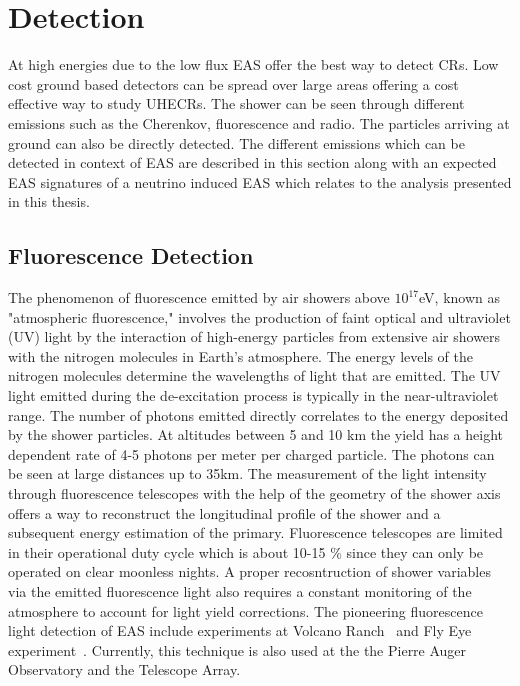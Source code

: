 \section{Detection}
\label{sec:EAS_det}
At high energies due to the low flux EAS offer the best way to detect CRs. Low cost ground based detectors can be spread over large areas offering a cost effective way to study UHECRs. The shower can be seen through different emissions such as the Cherenkov, fluorescence and radio. The particles arriving at ground can also be directly detected. The different emissions which can be detected in context of EAS are described in this section along with an expected EAS signatures of a neutrino induced EAS which relates to the analysis presented in this thesis.

\subsection*{Fluorescence Detection}
\label{sec:EAS_flu}
The phenomenon of fluorescence emitted by air showers above $10^{17}$eV, known as "atmospheric fluorescence," involves the production of faint optical and ultraviolet (UV) light by the interaction of high-energy particles from extensive air showers with the nitrogen molecules in Earth's atmosphere. The energy levels of the nitrogen molecules determine the wavelengths of light that are emitted. The UV light emitted during the de-excitation process is typically in the near-ultraviolet range. The number of photons emitted directly correlates to the energy deposited by the shower particles. At altitudes between 5 and 10 km the yield has a height dependent rate of 4-5 photons per meter per charged particle. The photons can be seen at large distances up to 35km. The measurement of the light intensity through fluorescence telescopes with the help of the geometry of the shower axis offers a way to reconstruct the longitudinal profile of the shower and a subsequent energy estimation of the primary. Fluorescence telescopes are limited in their operational duty cycle which is about 10-15 \% since they can only be operated on clear moonless nights. A proper recosntruction of shower variables via the emitted fluorescence light also requires a constant monitoring of the atmosphere to account for light yield corrections. The pioneering fluorescence light detection of EAS include experiments at Volcano Ranch~\cite{} and Fly Eye experiment~\cite{}. Currently, this technique is also used at the the Pierre Auger Observatory and the Telescope Array.


